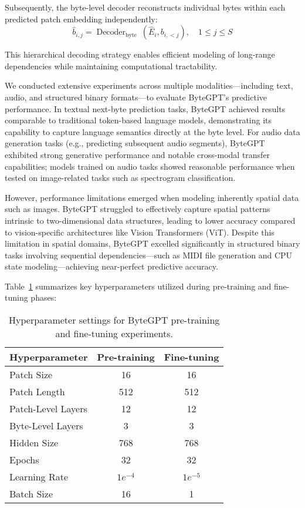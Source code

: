 \documentclass[a4paper, 11pt, twoside, openright]{report}
\begin{document}
Subsequently, the byte-level decoder reconstructs individual bytes within each predicted patch embedding independently:
\[
\hat{b}_{i,j}=\operatorname{Decoder}_{\text {byte }}(\hat{E}_{i}, b_{i,<j}), \quad 1 \leq j \leq S
\]

This hierarchical decoding strategy enables efficient modeling of long-range dependencies while maintaining computational tractability.

We conducted extensive experiments across multiple modalities—including text, audio, and structured binary formats—to evaluate ByteGPT's predictive performance. In textual next-byte prediction tasks, ByteGPT achieved results comparable to traditional token-based language models, demonstrating its capability to capture language semantics directly at the byte level. For audio data generation tasks (e.g., predicting subsequent audio segments), ByteGPT exhibited strong generative performance and notable cross-modal transfer capabilities; models trained on audio tasks showed reasonable performance when tested on image-related tasks such as spectrogram classification.

However, performance limitations emerged when modeling inherently spatial data such as images. ByteGPT struggled to effectively capture spatial patterns intrinsic to two-dimensional data structures, leading to lower accuracy compared to vision-specific architectures like Vision Transformers (ViT). Despite this limitation in spatial domains, ByteGPT excelled significantly in structured binary tasks involving sequential dependencies—such as MIDI file generation and CPU state modeling—achieving near-perfect predictive accuracy.

Table~\ref{tab:bgpt_hyperparameters} summarizes key hyperparameters utilized during pre-training and fine-tuning phases:

\begin{table}[h!]
    \centering
    \begin{tabular}{lcc}
        \hline
        Hyperparameter & Pre-training & Fine-tuning \\ 
        \hline
        Patch Size & 16 & 16 \\ 
        Patch Length & 512 & 512 \\ 
        Patch-Level Layers & 12 & 12 \\ 
        Byte-Level Layers & 3 & 3 \\ 
        Hidden Size & 768 & 768 \\ 
        Epochs & 32 & 32 \\ 
        Learning Rate & \(1e^{-4}\) & \(1e^{-5}\) \\ 
        Batch Size & 16 & 1 \\ 
        \hline
    \end{tabular}
    \caption{Hyperparameter settings for ByteGPT pre-training and fine-tuning experiments.}
    \label{tab:bgpt_hyperparameters}
\end{table}
\end{document}
